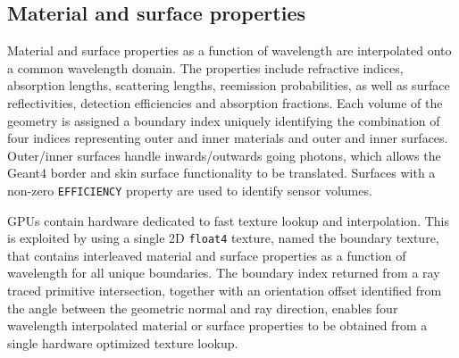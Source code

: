\documentclass{webofc}
\begin{document}
\subsection{Material and surface properties} 

Material and surface properties as a function of wavelength are interpolated onto a common wavelength domain.
The properties include refractive indices, absorption lengths, scattering lengths, reemission probabilities, 
as well as surface reflectivities, detection efficiencies and absorption fractions. 
Each volume of the geometry is assigned a boundary index uniquely identifying the combination of four indices representing 
outer and inner materials and outer and inner surfaces. Outer/inner surfaces handle inwards/outwards going photons, which allows the Geant4 border and skin
surface functionality to be translated. Surfaces with a non-zero {\tt EFFICIENCY} property are used to identify sensor volumes. 

GPUs contain hardware dedicated to fast texture lookup and interpolation.
This is exploited by using a single 2D {\tt float4} texture, named the boundary texture,
that contains interleaved material and surface properties as a function of wavelength for all
unique boundaries.
The boundary index returned from a ray traced primitive intersection, together with
an orientation offset identified from the angle between the geometric normal and ray direction,
enables four wavelength interpolated material or surface properties to be
obtained from a single hardware optimized texture lookup.
\end{document}
